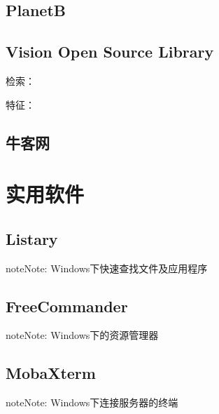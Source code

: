 \documentclass[letterpaper,10pt,english]{sphinxmanual}
\begin{document}
\section{PlanetB}
\label{\detokenize{link/index:planetb}}


\section{Vision Open Source Library}
\label{\detokenize{link/index:vision-open-source-library}}
检索： 

特征： 


\section{牛客网}
\label{\detokenize{link/index:id2}}


\chapter{实用软件}
\label{\detokenize{softwares/index::doc}}\label{\detokenize{softwares/index:id1}}

\section{Listary}
\label{\detokenize{softwares/index:listary}}
\begin{sphinxadmonition}{note}{Note:}
Windows下快速查找文件及应用程序

\end{sphinxadmonition}


\section{FreeCommander}
\label{\detokenize{softwares/index:freecommander}}
\begin{sphinxadmonition}{note}{Note:}
Windows下的资源管理器

\end{sphinxadmonition}


\section{MobaXterm}
\label{\detokenize{softwares/index:mobaxterm}}
\begin{sphinxadmonition}{note}{Note:}
Windows下连接服务器的终端

\end{sphinxadmonition}
\end{document}
